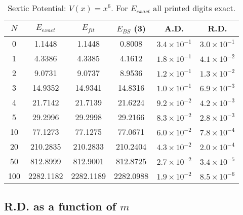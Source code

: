 \documentclass[preprint,preprintnumbers,amsmath,amssymb]{revtex4}
\begin{document}
\begin{table}[h]
	\caption{Sextic Potential: $V(x)=x^6$. For $E_{exact}$ all printed digits exact.}
{\setlength{\tabcolsep}{0.4cm}		
	\begin{tabular}{cccccc}
\hline				
		$N$ & $E_{exact}$ & $E_{fit}$& $E_{BS}$ (3) & A.D. & R.D. \\
\hline		
		0   & 1.1448     & 1.1448    & 0.8008     & $3.4\times 10^{-1}$ & $3.0\times 10^{-1}$             \\
		1   & 4.3386     & 4.3385    & 4.1612     & $1.8\times 10^{-1}$ & $4.1\times 10^{-2}$              \\
		2   & 9.0731     & 9.0737    & 8.9536     & $1.2\times 10^{-1}$ & $1.3\times 10^{-2}$             \\
		3   & 14.9352    & 14.9341   & 14.8316    & $1.0\times 10^{-1}$ & $6.9\times 10^{-3}$            \\
		4   & 21.7142    & 21.7139   & 21.6224    & $9.2\times 10^{-2}$ & $4.2\times 10^{-3}$             \\
		5   & 29.2996    & 29.2998   & 29.2166    & $8.3\times 10^{-2}$ & $2.8\times 10^{-3}$             \\
		10  & 77.1273    & 77.1275   & 77.0671    & $6.0\times 10^{-2}$ & $7.8\times 10^{-4}$            \\
		20  & 210.2835   & 210.2833  & 210.2404   & $4.3\times 10^{-2}$ & $2.0\times 10^{-4}$              \\
		50  & 812.8999   & 812.9001  & 812.8725   & $2.7\times 10^{-2}$ & $3.4\times 10^{-5}$             \\
		100 & 2282.1182  & 2282.1189 & 2282.0988  & $1.9\times 10^{-2}$ & $8.5\times 10^{-6}$
\\
\hline				
	\end{tabular}
}
\end{table}

\subsection*{R.D. as a function of $m$}
\end{document}
